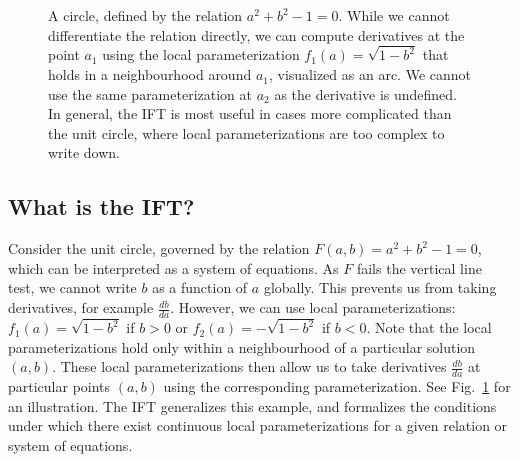 \documentclass[11pt]{article}
\begin{document}
\begin{figure}
\centering
{}
\caption{
\label{fig:circle}
A circle, defined by the relation $a^2 + b^2 - 1 = 0$.
While we cannot differentiate the relation directly,
we can compute derivatives at the point $a_1$ using the local parameterization $f_1(a)=\sqrt{1-b^2}$ that holds
in a neighbourhood around $a_1$, visualized as an arc.
We cannot use the same parameterization at $a_2$ as the derivative is undefined.
In general, the IFT is most useful in cases more complicated than the unit circle,
where local parameterizations are too complex to write down.
}
\end{figure}


\subsection{What is the IFT?}
Consider the unit circle,
governed by the relation $F(a,b) = a^2 + b^2 - 1 = 0$,
which can be interpreted as a system of equations.
As $F$ fails the vertical line test, we cannot write $b$ as a function of $a$ globally.
This prevents us from taking derivatives, for example $\frac{db}{da}$.
However, we can use local parameterizations: $f_1(a) = \sqrt{1-b^2}$ if $b > 0$
or $f_2(a) = -\sqrt{1-b^2}$ if $b<0$.
Note that the local parameterizations hold only within a neighbourhood of a particular
solution $(a,b)$.
These local parameterizations then allow us to take derivatives $\frac{db}{da}$
at particular points $(a,b)$ using the corresponding parameterization.
See Fig.~\ref{fig:circle} for an illustration.
The IFT generalizes this example, and formalizes the conditions under which there exist
continuous local parameterizations for a given relation or system of equations.
\end{document}
